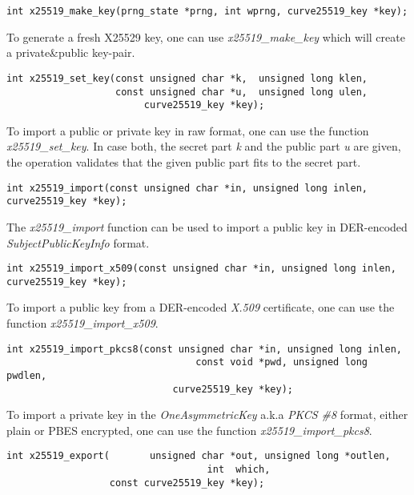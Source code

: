 \documentclass[synpaper]{book}
\begin{document}
\begin{verbatim}
int x25519_make_key(prng_state *prng, int wprng, curve25519_key *key);
\end{verbatim}

To generate a fresh X25529 key, one can use \textit{x25519\_make\_key} which will create a private\&public key-pair.

\begin{verbatim}
int x25519_set_key(const unsigned char *k,  unsigned long klen,
                   const unsigned char *u,  unsigned long ulen,
                        curve25519_key *key);
\end{verbatim}

To import a public or private key in raw format, one can use the function \textit{x25519\_set\_key}.
In case both, the secret part \textit{k} and the public part \textit{u} are given, the operation validates that the given 
public part fits to the secret part.

\begin{verbatim}
int x25519_import(const unsigned char *in, unsigned long inlen, curve25519_key *key);
\end{verbatim}

The \textit{x25519\_import} function can be used to import a public key in DER-encoded \textit{SubjectPublicKeyInfo} format.

\begin{verbatim}
int x25519_import_x509(const unsigned char *in, unsigned long inlen, curve25519_key *key);
\end{verbatim}

To import a public key from a DER-encoded \textit{X.509} certificate, one can use the function \textit{x25519\_import\_x509}.

\begin{verbatim}
int x25519_import_pkcs8(const unsigned char *in, unsigned long inlen,
                                 const void *pwd, unsigned long pwdlen,
                             curve25519_key *key);
\end{verbatim}

To import a private key in the \textit{OneAsymmetricKey} a.k.a \textit{PKCS \#8} format, either plain or PBES encrypted,
one can use the function \textit{x25519\_import\_pkcs8}.

\begin{verbatim}
int x25519_export(       unsigned char *out, unsigned long *outlen,
                                   int  which,
                  const curve25519_key *key);
\end{verbatim}
\end{document}
